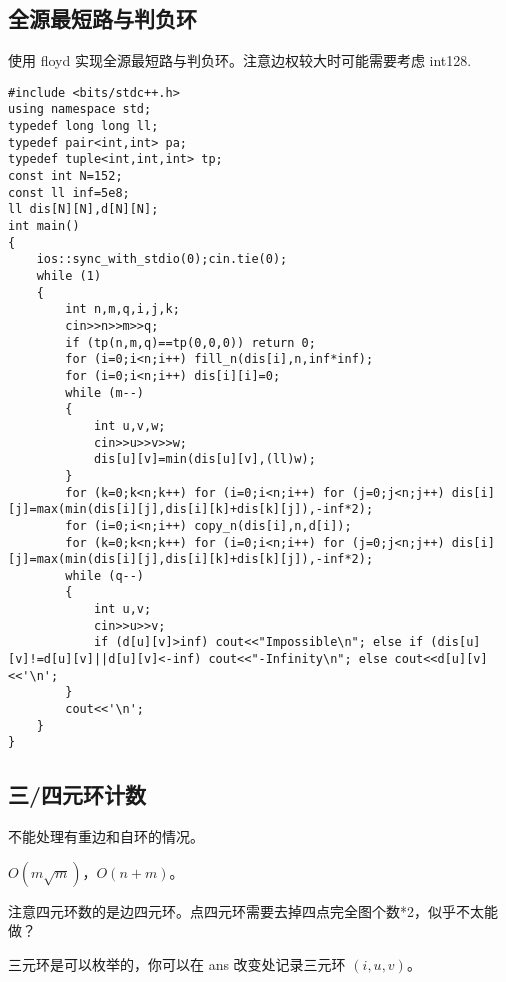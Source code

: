 \documentclass[12pt]{ctexart}
\begin{document}
\subsection{全源最短路与判负环}

使用 floyd 实现全源最短路与判负环。注意边权较大时可能需要考虑 int128.

\begin{lstlisting}
#include <bits/stdc++.h>
using namespace std;
typedef long long ll;
typedef pair<int,int> pa;
typedef tuple<int,int,int> tp;
const int N=152;
const ll inf=5e8;
ll dis[N][N],d[N][N];
int main()
{
	ios::sync_with_stdio(0);cin.tie(0);
	while (1)
	{
		int n,m,q,i,j,k;
		cin>>n>>m>>q;
		if (tp(n,m,q)==tp(0,0,0)) return 0;
		for (i=0;i<n;i++) fill_n(dis[i],n,inf*inf);
		for (i=0;i<n;i++) dis[i][i]=0;
		while (m--)
		{
			int u,v,w;
			cin>>u>>v>>w;
			dis[u][v]=min(dis[u][v],(ll)w);
		}
		for (k=0;k<n;k++) for (i=0;i<n;i++) for (j=0;j<n;j++) dis[i][j]=max(min(dis[i][j],dis[i][k]+dis[k][j]),-inf*2);
		for (i=0;i<n;i++) copy_n(dis[i],n,d[i]);
		for (k=0;k<n;k++) for (i=0;i<n;i++) for (j=0;j<n;j++) dis[i][j]=max(min(dis[i][j],dis[i][k]+dis[k][j]),-inf*2);
		while (q--)
		{
			int u,v;
			cin>>u>>v;
			if (d[u][v]>inf) cout<<"Impossible\n"; else if (dis[u][v]!=d[u][v]||d[u][v]<-inf) cout<<"-Infinity\n"; else cout<<d[u][v]<<'\n';
		}
		cout<<'\n';
	}
}
\end{lstlisting}

\subsection{三/四元环计数}

不能处理有重边和自环的情况。

$O(m\sqrt m)$，$O(n+m)$。

注意四元环数的是边四元环。点四元环需要去掉四点完全图个数*2，似乎不太能做？

三元环是可以枚举的，你可以在 ans 改变处记录三元环 $(i,u,v)$。
\end{document}
